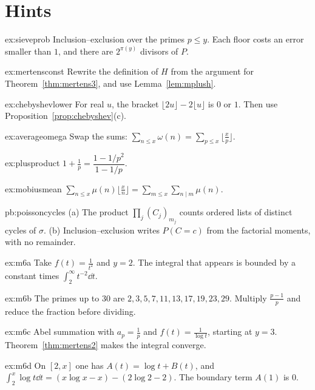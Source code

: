\section{Hints}

\begin{hint}{ex:sieveprob}
Inclusion--exclusion over the primes $p\le y$. Each floor costs an error smaller than $1$, and there are $2^{\pi(y)}$ divisors of $P$.
\end{hint}
\begin{hint}{ex:mertensconst}
Rewrite the definition of $H$ from the argument for Theorem~\ref{thm:mertens3}, and use Lemma~\ref{lem:mplush}.
\end{hint}
\begin{hint}{ex:chebyshevlower}
For real $u$, the bracket $\lfloor 2u\rfloor-2\lfloor u\rfloor$ is $0$ or $1$. Then use Proposition~\ref{prop:chebyshev}(c).
\end{hint}
\begin{hint}{ex:averageomega}
Swap the sums: $\sum_{n\le x}\omega(n)=\sum_{p\le x}\bigl\lfloor\frac xp\bigr\rfloor$.
\end{hint}
\begin{hint}{ex:plusproduct}
$1+\frac1p=\dfrac{1-1/p^2}{1-1/p}$.
\end{hint}
\begin{hint}{ex:mobiusmean}
$\sum_{n\le x}\mu(n)\bigl\lfloor\frac xn\bigr\rfloor=\sum_{m\le x}\sum_{n\mid m}\mu(n)$.
\end{hint}

\begin{hint}{pb:poissoncycles}
(a) The product $\prod_j(C_j)_{m_j}$ counts ordered lists of distinct cycles of $\sigma$. (b) Inclusion--exclusion writes $P(C=c)$ from the factorial moments, with no remainder.
\end{hint}

\begin{hint}{ex:m6a}
Take $f(t)=\frac1{t^2}$ and $y=2$. The integral that appears is bounded by a constant times $\int_2^\infty t^{-2}\dd t$.
\end{hint}
\begin{hint}{ex:m6b}
The primes up to $30$ are $2,3,5,7,11,13,17,19,23,29$. Multiply $\frac{p-1}p$ and reduce the fraction before dividing.
\end{hint}
\begin{hint}{ex:m6c}
Abel summation with $a_p=\frac1p$ and $f(t)=\frac1{\log t}$, starting at $y=3$. Theorem~\ref{thm:mertens2} makes the integral converge.
\end{hint}
\begin{hint}{ex:m6d}
On $[2,x]$ one has $A(t)=\log t+B(t)$, and $\int_2^x\log t\dd t=(x\log x-x)-(2\log 2-2)$. The boundary term $A(1)$ is $0$.
\end{hint}

